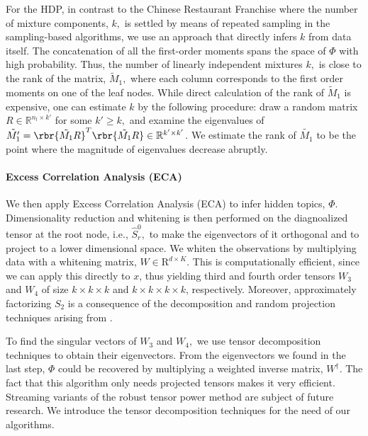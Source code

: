 \documentclass[twoside,11pt]{article}
\begin{document}
{For the HDP, in contrast to the Chinese Restaurant Franchise where the number 
of mixture components, $k,$ is
settled by means of repeated sampling in the sampling-based algorithms, we use an approach that
directly infers $k$ from data itself.
The concatenation of all the first-order moments spans the space of $\Phi$ with high probability. Thus, the number of
linearly independent mixtures $k,$ is close to the rank of the matrix,
$\tilde{M}_1,$ where each column corresponds to the first order 
moments on one of the leaf nodes.
 While direct calculation of the rank of $\tilde{M}_1$
is expensive, one can estimate $k$ by the following procedure:
draw a random matrix $R \in \mathbb{R}^{n_l \times k'}$ for some $k'
\geq k,$ and examine the eigenvalues of $ \tilde{M_1'} =
\rbr{\tilde{M_1}R}^T\rbr{\tilde{M_1}R} \in \mathbb{R}^{k' \times
  k'}$. We estimate the rank of $\tilde{M_1}$ to be the point where the magnitude of eigenvalues decrease abruptly.





\paragraph{Excess Correlation Analysis (ECA)}
We then apply Excess Correlation Analysis (ECA) to infer hidden topics, $\Phi.$
 Dimensionality reduction and whitening is then performed on the diagnoalized tensor 
 at the root node, i.e., $\hat{S}_r^0,$ to make the eigenvectors of it orthogonal and 
 to project to a lower dimensional space. We whiten the observations by multiplying 
 data with a whitening matrix, $W \in \mathrm{R}^{d \times K}$. 
 This is computationally efficient, since we can apply this
directly to $x$, thus yielding third and fourth order tensors $W_3$
and $W_4$ of size $k \times k \times k$ and 
$k \times k \times k \times k$, respectively. 
Moreover, approximately factorizing $S_2$ is a
consequence of the decomposition and random projection techniques
arising from \cite{HalMarTro09}.

To find the singular vectors of $W_3$ and $W_4,$ we use tensor decomposition
techniques to obtain their eigenvectors. From the eigenvectors we
found in the last step, $\Phi$ could be recovered by multiplying a weighted 
inverse matrix, $W^\dag$. The fact that this algorithm
only needs projected tensors makes it very efficient. Streaming
variants of the robust tensor power method are subject of future
research. We introduce 
the tensor decomposition techniques for the need of our algorithms.


}
\end{document}
